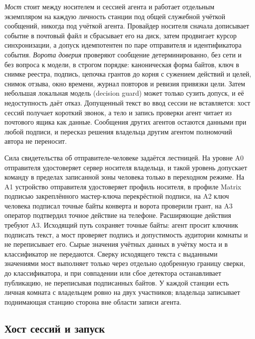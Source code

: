 \documentclass[10pt,a4paper]{article}
\begin{document}
\emph{Мост} стоит между носителем и сессией агента и работает отдельным экземпляром на каждую личность станции под общей служебной учёткой сообщений, никогда под учёткой агента. Провайдер носителя сначала дописывает событие в почтовый файл и сбрасывает его на диск, затем продвигает курсор синхронизации, а допуск идемпотентен по паре отправителя и идентификатора события. \emph{Ворота доверия} проверяют сообщение детерминированно, без сети и без вопроса к модели, в строгом порядке: каноническая форма байтов, ключ в снимке реестра, подпись, цепочка грантов до корня с сужением действий и целей, снимок отзыва, окно времени, журнал повторов и ревизия привязки цели. Затем небольшая локальная модель (decision guard) может только сузить допуск, и её недоступность даёт отказ. Допущенный текст во ввод сессии не вставляется: хост сессий получает короткий звонок, а тело и запись проверки агент читает из почтового ящика как данные. Сообщения других агентов остаются данными при любой подписи, и пересказ решения владельца другим агентом полномочий автора не переносит.

Сила свидетельства об отправителе-человеке задаётся лестницей. На уровне A0 отправителя удостоверяет сервер носителя владельца, и такой уровень допускает команду в пределах записанной зоны человека только в переходном режиме. На A1 устройство отправителя удостоверяет профиль носителя, в профиле Matrix подписью закреплённого мастер-ключа перекрёстной подписи, на A2 ключ человека подписал точные байты конверта и ворота проверили грант, на A3 оператор подтвердил точное действие на телефоне. Расширяющие действия требуют A3. Исходящий путь сохраняет точные байты: агент просит ключник подписать текст, а мост проверяет подпись и допустимость аудитории комнаты и не переписывает его. Сырые значения учётных данных в учётку моста и в классификатор не передаются. Сверку исходящего текста с выданными значениями мост выполняет только через отдельно одобренную границу сверки, до классификатора, и при совпадении или сбое детектора останавливает публикацию, не переписывая подписанных байтов. У каждой станции есть личная комната с владельцем ровно на двух участников; владельца записывает поднимающая станцию сторона вне области записи агента.

\subsection{Хост сессий и запуск}
\label{sec:sessions}
\end{document}
